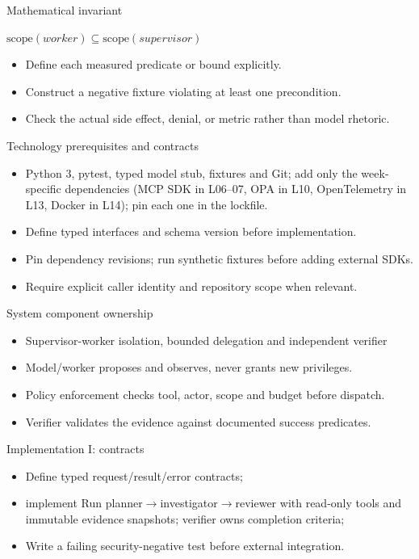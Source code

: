 \documentclass[aspectratio=169,10pt]{beamer}
\begin{document}
\begin{frame}{Mathematical invariant}
\small
\begin{center}\Large $\mathrm{scope}(worker)\subseteq\mathrm{scope}(supervisor)$\end{center}
\begin{itemize}
\item Define each measured predicate or bound explicitly.
\item Construct a negative fixture violating at least one precondition.
\item Check the actual side effect, denial, or metric rather than model rhetoric.
\end{itemize}

\end{frame}

\begin{frame}{Technology prerequisites and contracts}
\small
\begin{itemize}
\item Python 3, pytest, typed model stub, fixtures and Git; add only the week-specific dependencies (MCP SDK in L06--07, OPA in L10, OpenTelemetry in L13, Docker in L14); pin each one in the lockfile.
\item Define typed interfaces and schema version before implementation.
\item Pin dependency revisions; run synthetic fixtures before adding external SDKs.
\item Require explicit caller identity and repository scope when relevant.
\end{itemize}

\end{frame}

\begin{frame}{System component ownership}
\small
\begin{itemize}
\item Supervisor-worker isolation, bounded delegation and independent verifier
\item Model/worker proposes and observes, never grants new privileges.
\item Policy enforcement checks tool, actor, scope and budget before dispatch.
\item Verifier validates the evidence against documented success predicates.
\end{itemize}

\end{frame}

\begin{frame}{Implementation I: contracts}
\small
\begin{itemize}
\item Define typed request/result/error contracts;
\item implement Run planner$\rightarrow$investigator$\rightarrow$reviewer with read-only tools and immutable evidence snapshots; verifier owns completion criteria;
\item Write a failing security-negative test before external integration.
\end{itemize}

\end{frame}
\end{document}
